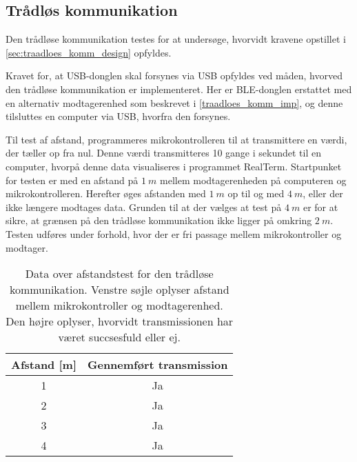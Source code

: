 \subsection{Trådløs kommunikation}
Den trådløse kommunikation testes for at undersøge, hvorvidt kravene opstillet i \autoref{sec:traadloes_komm_design} opfyldes. 

\noindent
Kravet for, at USB-donglen skal forsynes via USB opfyldes ved måden, hvorved den trådløse kommunikation er implementeret. Her er BLE-donglen erstattet med en alternativ modtagerenhed som beskrevet i \autoref{traadloes_komm_imp}, og denne tilsluttes en computer via USB, hvorfra den forsynes. 


\noindent
Til test af afstand, programmeres mikrokontrolleren til at transmittere en værdi, der tæller op fra nul. Denne værdi transmitteres 10 gange i sekundet til en computer, hvorpå denne data visualiseres i programmet RealTerm.
Startpunket for testen er med en afstand på $1~m$ mellem modtagerenheden på computeren og mikrokontrolleren. Herefter øges afstanden med $1~m$ op til og med $4~m$, eller der ikke længere modtages data. Grunden til at der vælges at test på $4~m$ er for at sikre, at grænsen på den trådløse kommunikation ikke ligger på omkring $2~m$. Testen udføres under forhold, hvor der er fri passage mellem mikrokontroller og modtager.  

\begin{table}[H]
\centering
\begin{tabular}{|c|c|}
\hline 
Afstand [m] & Gennemført transmission \\ 
\hline 
1 & Ja \\ 
\hline 
2 & Ja \\ 
\hline 
3 & Ja \\ 
\hline 
4 & Ja \\ 
\hline 
\end{tabular} 
\caption{Data over afstandstest for den trådløse kommunikation. Venstre søjle oplyser afstand mellem mikrokontroller og modtagerenhed. Den højre oplyser, hvorvidt transmissionen har været succsesfuld eller ej.}
\label{tab:traadloes_komm_test_afstand}
\end{table}

